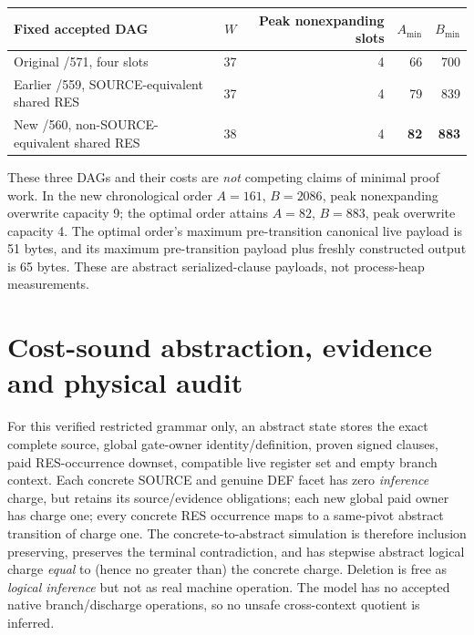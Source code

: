 \documentclass[11pt]{article}
\begin{document}
\begin{center}
\begin{tabular}{lrrrr}
\toprule
Fixed accepted DAG & $W$ & Peak nonexpanding slots & $A_{\min}$ & $B_{\min}$\\
\midrule
Original /571, four slots &37&4&66&700\\
Earlier /559, SOURCE-equivalent shared RES &37&4&79&839\\
New /560, non-SOURCE-equivalent shared RES &38&4&\textbf{82}&\textbf{883}\\
\bottomrule
\end{tabular}
\end{center}
These three DAGs and their costs are \emph{not} competing claims of minimal proof work. In the new chronological order $A=161$, $B=2086$, peak nonexpanding overwrite capacity 9; the optimal order attains $A=82$, $B=883$, peak overwrite capacity 4. The optimal order's maximum pre-transition canonical live payload is 51 bytes, and its maximum pre-transition payload plus freshly constructed output is 65 bytes. These are abstract serialized-clause payloads, not process-heap measurements.

\section*{Cost-sound abstraction, evidence and physical audit}
For this verified restricted grammar only, an abstract state stores the exact complete source, global gate-owner identity/definition, proven signed clauses, paid RES-occurrence downset, compatible live register set and empty branch context. Each concrete SOURCE and genuine DEF facet has zero \emph{inference} charge, but retains its source/evidence obligations; each new global paid owner has charge one; every concrete RES occurrence maps to a same-pivot abstract transition of charge one. The concrete-to-abstract simulation is therefore inclusion preserving, preserves the terminal contradiction, and has stepwise abstract logical charge \emph{equal} to (hence no greater than) the concrete charge. Deletion is free as \emph{logical inference} but not as real machine operation. The model has no accepted native branch/discharge operations, so no unsafe cross-context quotient is inferred.
\end{document}
